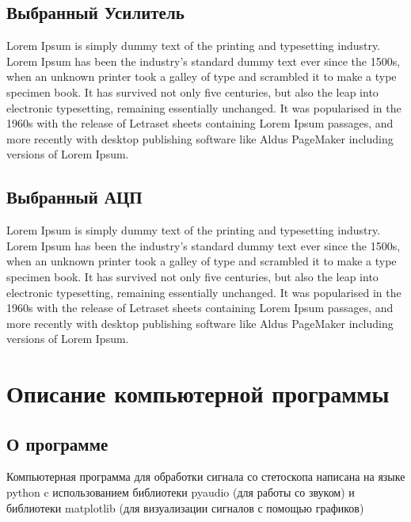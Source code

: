 \subsection{Выбранный Усилитель}

Lorem Ipsum is simply dummy text of the printing and typesetting industry. Lorem Ipsum has been the industry's standard dummy text ever since the 1500s, when an unknown printer took a galley of type and scrambled it to make a type specimen book. It has survived not only five centuries, but also the leap into electronic typesetting, remaining essentially unchanged. It was popularised in the 1960s with the release of Letraset sheets containing Lorem Ipsum passages, and more recently with desktop publishing software like Aldus PageMaker including versions of Lorem Ipsum.

\subsection{Выбранный АЦП}

Lorem Ipsum is simply dummy text of the printing and typesetting industry. Lorem Ipsum has been the industry's standard dummy text ever since the 1500s, when an unknown printer took a galley of type and scrambled it to make a type specimen book. It has survived not only five centuries, but also the leap into electronic typesetting, remaining essentially unchanged. It was popularised in the 1960s with the release of Letraset sheets containing Lorem Ipsum passages, and more recently with desktop publishing software like Aldus PageMaker including versions of Lorem Ipsum.




\newpage
\section{Описание компьютерной программы}
\subsection{О программе}
Компьютерная программа для обработки сигнала со стетоскопа написана на языке python c использованием библиотеки pyaudio (для работы со звуком) и библиотеки matplotlib (для визуализации сигналов с помощью графиков)

